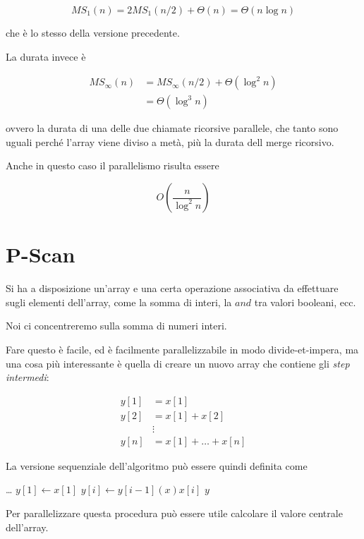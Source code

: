 $$
MS_1(n) = 2 MS_1(n/2) + \Theta(n) = \Theta (n \log n)
$$

che è lo stesso della versione precedente.

La durata invece è

\begin{align*}
MS_\infty (n) &= MS_\infty (n/2) + \Theta(\log^2 n) \\
              &=\Theta (\log^3 n)
\end{align*}

ovvero la durata di una delle due chiamate ricorsive parallele, che tanto sono uguali perché l'array viene diviso a metà, più la durata dell merge ricorsivo.

Anche in questo caso il parallelismo risulta essere

$$
O(\frac{n}{\log^2 n})
$$

\section{P-Scan}\label{p-scan}

Si ha a disposizione un'array e una certa operazione associativa da effettuare sugli elementi dell'array, come la somma di interi, la $and$ tra valori booleani, ecc.

Noi ci concentreremo sulla somma di numeri interi.

Fare questo è facile, ed è facilmente parallelizzabile in modo divide-et-impera, ma una cosa più interessante è quella di creare un nuovo array che contiene gli \emph{step intermedi}:

\begin{align*}
y[1] &= x[1] \\
y[2] &= x[1] + x[2] \\
&\vdots \\
y[n] &= x[1] + \ldots + x[n]
\end{align*}

La versione sequenziale dell'algoritmo può essere quindi definita come

\begin{breakablealgorithm}
\begin{algorithmic}[1]
\State \ldots
\State $y[1] \gets x[1]$
    \State $y[i]\gets y[i-1] (x) x[i]$
\EndFor
\State \Return $y$
\EndFunction
\end{algorithmic}
\end{breakablealgorithm}

Per parallelizzare questa procedura può essere utile calcolare il valore centrale dell'array.

